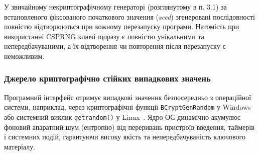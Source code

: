 У звичайному некриптографічному генераторі (розглянутому в п. 3.1) за встановленого фіксованого
початкового значення (\textit{seed}) згенеровані послідовності повністю відтворюються при кожному
перезапуску програми. Натомість при використанні CSPRNG ключі щоразу є повністю унікальними та
непередбачуваними, а їх відтворення чи повторення після перезапуску є неможливим.

\subsubsection{Джерело криптографічно стійких випадкових значень}

Програмний інтерфейс отримує випадкові значення безпосередньо з операційної системи, наприклад, через
криптографічні функції \texttt{BCryptGenRandom} у Windows або системний виклик \texttt{getrandom()} у
Linux~\cite{SP800-90A, cryptography}. Ядро ОС динамічно акумулює фоновий апаратний шум (ентропію) від
переривань пристроїв введення, таймерів і системних подій, гарантуючи високу якість та непередбачуваність
ключового матеріалу.
